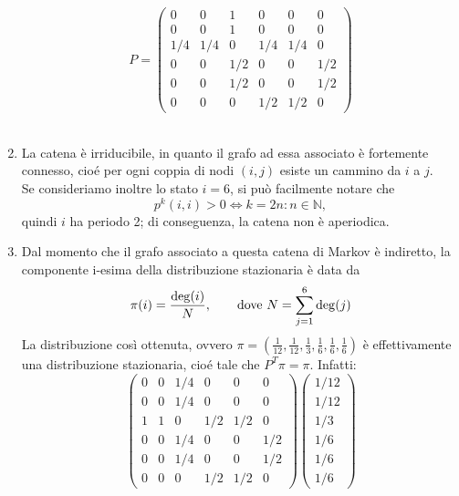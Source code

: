 \documentclass[
	12pt, %
]{fphw}
\begin{document}
\begin{enumerate}
	\begin{equation*}
		P = 
		\begin{pmatrix}
			0 & 0 & 1 & 0 & 0 & 0\\
			0 & 0 & 1 & 0 & 0 & 0\\
			1/4 & 1/4 & 0 & 1/4 & 1/4 & 0\\
			0 & 0 & 1/2 & 0 & 0 & 1/2\\
			0 & 0 & 1/2 & 0 & 0 & 1/2\\
			0 & 0 & 0 & 1/2 & 1/2 & 0
		\end{pmatrix}
	\end{equation*}
	\\
	\item La catena è irriducibile, in quanto il grafo ad essa associato è fortemente connesso, cioé 
	per ogni coppia di nodi $(i,j)$ esiste un cammino da $i$ a $j$.\\
	Se consideriamo inoltre lo stato $i = 6$, si può facilmente notare che
	\begin{equation*}
		p^{k}(i,i) > 0 \iff k = 2n : n \in \mathbb{N},
	\end{equation*}
	quindi $i$ ha periodo 2; di conseguenza, la catena non è aperiodica.\\
	\item Dal momento che il grafo associato a questa catena di Markov è indiretto, la componente i-esima della distribuzione stazionaria è data da 
	\begin{equation*}
		\pi(i) = \frac{\deg(i)}{N}, \qquad\textnormal{dove }N = \sum_{j=1}^6 \deg(j)
	\end{equation*}
	La distribuzione così ottenuta, ovvero $\pi = (\frac{1}{12}, \frac{1}{12}, \frac{1}{3}, \frac{1}{6}, \frac{1}{6}, \frac{1}{6})$ è effettivamente una distribuzione stazionaria, cioé tale che $P^T \pi = \pi$. Infatti:
	\begin{equation*}
		\begin{pmatrix}
			0 & 0 & 1/4 & 0 & 0 & 0\\
			0 & 0 & 1/4 & 0 & 0 & 0\\
			1 & 1 & 0 & 1/2 & 1/2 & 0\\
			0 & 0 & 1/4 & 0 & 0 & 1/2\\
			0 & 0 & 1/4 & 0 & 0 & 1/2\\
			0 & 0 & 0 & 1/2 & 1/2 & 0
		\end{pmatrix}
		\begin{pmatrix}
			1/12 \\ 1/12 \\ 1/3 \\ 1/6 \\ 1/6 \\ 1/6

\end{pmatrix}
\end{equation*}
\end{enumerate}
\end{document}
